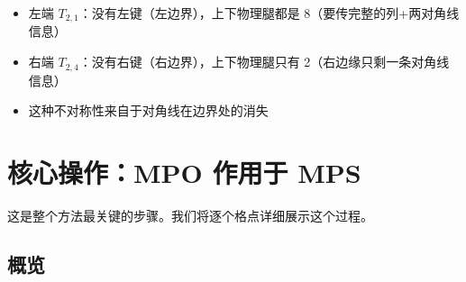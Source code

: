\documentclass[12pt,a4paper]{article}
\begin{document}
\begin{warnbox}[注意左端和右端的不对称性]
\begin{itemize}
  \item 左端 $T_{2,1}$：没有左键（左边界），上下物理腿都是 8（要传完整的列+两对角线信息）
  \item 右端 $T_{2,4}$：没有右键（右边界），上下物理腿只有 2（右边缘只剩一条对角线信息）
  \item 这种不对称性来自于对角线在边界处的消失
\end{itemize}
\end{warnbox}


\section{核心操作：MPO 作用于 MPS}

这是整个方法最关键的步骤。我们将逐个格点详细展示这个过程。

\subsection{概览}
\end{document}
